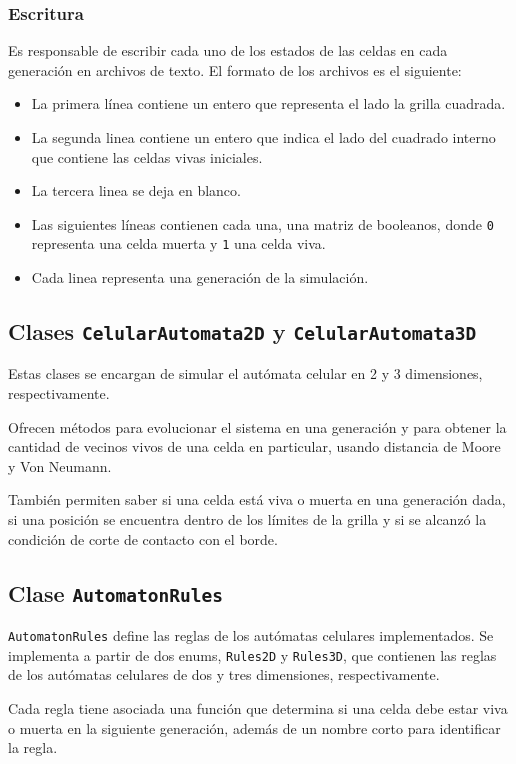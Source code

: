 \subsubsection{Escritura}
\label{subsubsec:escritura}
Es responsable de escribir cada uno de los estados de las celdas en cada generación en archivos de texto.
El formato de los archivos es el siguiente:
\begin{itemize}
    \item La primera línea contiene un entero que representa el lado la grilla cuadrada.
    \item La segunda linea contiene un entero que indica el lado del cuadrado interno que contiene las celdas vivas iniciales.
    \item La tercera linea se deja en blanco.
    \item Las siguientes líneas contienen cada una, una matriz de booleanos, donde \texttt{0} representa una celda muerta y \texttt{1} una celda viva.
    \item Cada linea representa una generación de la simulación.
\end{itemize}

\subsection{Clases \texttt{CelularAutomata2D} y \texttt{CelularAutomata3D}}
\label{subsec:celularautomata}
Estas clases se encargan de simular el autómata celular en 2 y 3 dimensiones, respectivamente.

Ofrecen métodos para evolucionar el sistema en una generación y para obtener la cantidad de vecinos vivos de una celda en particular, usando distancia de Moore y Von Neumann.

También permiten saber si una celda está viva o muerta en una generación dada, si una posición se encuentra dentro de los límites de la grilla y si se alcanzó la condición de corte de contacto con el borde.

\subsection{Clase \texttt{AutomatonRules}}
\label{subsec:automatonrules}
\texttt{AutomatonRules} define las reglas de los autómatas celulares implementados.
Se implementa a partir de dos enums, \texttt{Rules2D} y \texttt{Rules3D}, que contienen las reglas de los autómatas celulares de dos y tres dimensiones, respectivamente.

Cada regla tiene asociada una función que determina si una celda debe estar viva o muerta en la siguiente generación, además de un nombre corto para identificar la regla.
